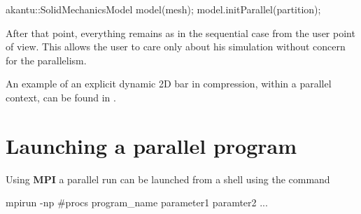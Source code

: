 \begin{cpp}
  akantu::SolidMechanicsModel model(mesh);
  model.initParallel(partition);
\end{cpp}

After that point, everything remains as in the sequential case from
the user point of view. This allows the user to care only
about his simulation without concern for the parallelism.

An example of an explicit dynamic 2D bar in compression, within a parallel
context, can be found in .

\section{Launching a parallel program}

Using \textbf{MPI} a parallel run can be launched from a shell
using the command

\begin{cpp}
  mpirun -np #procs program_name parameter1 paramter2 ...
\end{cpp}

